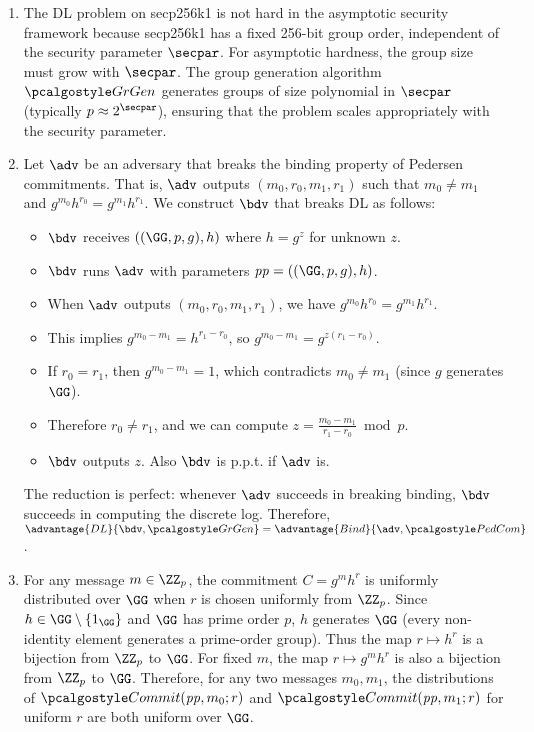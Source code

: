 \begin{enumerate}
  \item The DL problem on secp256k1 is not hard in the asymptotic security framework because secp256k1 has a fixed 256-bit group order, independent of the security parameter $\secpar$.
        For asymptotic hardness, the group size must grow with $\secpar$.
        The group generation algorithm $\grgen$ generates groups of size polynomial in $\secpar$ (typically $p \approx 2^\secpar$), ensuring that the problem scales appropriately with the security parameter.

  \item Let $\adv$ be an adversary that breaks the binding property of Pedersen commitments.
        That is, $\adv$ outputs $(m_0, r_0, m_1, r_1)$ such that $m_0 \neq m_1$ and $g^{m_0}h^{r_0} = g^{m_1}h^{r_1}$.
        We construct $\bdv$ that breaks DL as follows:
        \begin{itemize}
          \item $\bdv$ receives $(\gparam, h)$ where $h = g^z$ for unknown $z$.
          \item $\bdv$ runs $\adv$ with parameters $\params = (\gparam, h)$.
          \item When $\adv$ outputs $(m_0, r_0, m_1, r_1)$, we have $g^{m_0}h^{r_0} = g^{m_1}h^{r_1}$.
          \item This implies $g^{m_0 - m_1} = h^{r_1 - r_0}$, so $g^{m_0 - m_1} = g^{z(r_1 - r_0)}$.
          \item If $r_0 = r_1$, then $g^{m_0 - m_1} = 1$, which contradicts $m_0 \neq m_1$ (since $g$ generates $\GG$).
          \item Therefore $r_0 \neq r_1$, and we can compute $z = \frac{m_0 - m_1}{r_1 - r_0} \bmod p$.
          \item $\bdv$ outputs $z$. Also $\bdv$ is p.p.t. if $\adv$ is.
        \end{itemize}
        The reduction is perfect: whenever $\adv$ succeeds in breaking binding, $\bdv$ succeeds in computing the discrete log.
        Therefore, $\advantage{DL}{\bdv, \grgen} = \advantage{Bind}{\adv, \algo{PedCom}}$.

  \item For any message $m \in \ZZ_p$, the commitment $C = g^m h^r$ is uniformly distributed over $\GG$ when $r$ is chosen uniformly from $\ZZ_p$.
        Since $h \in \GG \setminus \{1_\GG\}$ and $\GG$ has prime order $p$, $h$ generates $\GG$ (every non-identity element generates a prime-order group).
        Thus the map $r \mapsto h^r$ is a bijection from $\ZZ_p$ to $\GG$.
        For fixed $m$, the map $r \mapsto g^m h^r$ is also a bijection from $\ZZ_p$ to $\GG$.
        Therefore, for any two messages $m_0, m_1$, the distributions of $\algo{Commit}(\params, m_0; r)$ and $\algo{Commit}(\params, m_1; r)$ for uniform $r$ are both uniform over $\GG$.


\end{enumerate}
